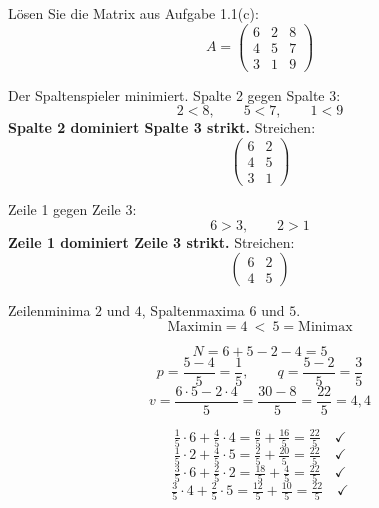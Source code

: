 \begin{aufgabe}
Lösen Sie die Matrix aus Aufgabe 1.1(c):
\[ A = \begin{pmatrix} 6 & 2 & 8\\ 4 & 5 & 7\\ 3 & 1 & 9 \end{pmatrix} \]

\loesung
{}
Der Spaltenspieler minimiert. Spalte 2 gegen Spalte 3:
\[ 2 < 8, \qquad 5 < 7, \qquad 1 < 9 \]
\textbf{Spalte 2 dominiert Spalte 3 strikt.} Streichen:
\[ \begin{pmatrix} 6 & 2\\ 4 & 5\\ 3 & 1 \end{pmatrix} \]

Zeile 1 gegen Zeile 3:
\[ 6 > 3, \qquad 2 > 1 \]
\textbf{Zeile 1 dominiert Zeile 3 strikt.} Streichen:
\[ \begin{pmatrix} 6 & 2\\ 4 & 5 \end{pmatrix} \]

\begin{center}
\begin{minipage}{0.86\textwidth}
\end{minipage}
\end{center}

Zeilenminima $2$ und $4$, Spaltenmaxima $6$ und $5$.
\[ \text{Maximin} = 4 \ <\ 5 = \text{Minimax} \]

\[ N = 6+5-2-4 = 5 \]
\[ p = \frac{5-4}{5} = \frac15, \qquad q = \frac{5-2}{5} = \frac35 \]
\[ v = \frac{6\cdot5 - 2\cdot4}{5} = \frac{30-8}{5} = \frac{22}{5} = 4{,}4 \]

\[ \tfrac15\cdot6 + \tfrac45\cdot4 = \tfrac{6}{5}+\tfrac{16}{5} = \tfrac{22}{5} \quad \checkmark \]
\[ \tfrac15\cdot2 + \tfrac45\cdot5 = \tfrac{2}{5}+\tfrac{20}{5} = \tfrac{22}{5} \quad \checkmark \]
\[ \tfrac35\cdot6 + \tfrac25\cdot2 = \tfrac{18}{5}+\tfrac{4}{5} = \tfrac{22}{5} \quad \checkmark \]
\[ \tfrac35\cdot4 + \tfrac25\cdot5 = \tfrac{12}{5}+\tfrac{10}{5} = \tfrac{22}{5} \quad \checkmark \]


\end{aufgabe}
